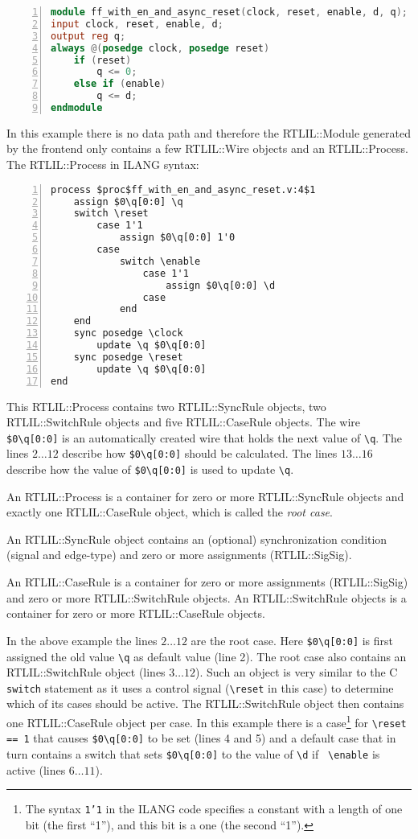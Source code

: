 \begin{lstlisting}[numbers=left,frame=single,language=Verilog]
module ff_with_en_and_async_reset(clock, reset, enable, d, q);
input clock, reset, enable, d;
output reg q;
always @(posedge clock, posedge reset)
	if (reset)
		q <= 0;
	else if (enable)
		q <= d;
endmodule
\end{lstlisting}

In this example there is no data path and therefore the RTLIL::Module generated by
the frontend only contains a few RTLIL::Wire objects and an RTLIL::Process.
The RTLIL::Process in ILANG syntax:

\begin{lstlisting}[numbers=left,frame=single,language=rtlil]
process $proc$ff_with_en_and_async_reset.v:4$1
	assign $0\q[0:0] \q
	switch \reset
		case 1'1
			assign $0\q[0:0] 1'0
		case
			switch \enable
				case 1'1
					assign $0\q[0:0] \d
				case
			end
	end
	sync posedge \clock
		update \q $0\q[0:0]
	sync posedge \reset
		update \q $0\q[0:0]
end
\end{lstlisting}

This RTLIL::Process contains two RTLIL::SyncRule objects, two RTLIL::SwitchRule
objects and five RTLIL::CaseRule objects. The wire {\tt \$0\textbackslash{}q[0:0]}
is an automatically created wire that holds the next value of {\tt \textbackslash{}q}. The lines
$2 \dots 12$ describe how {\tt \$0\textbackslash{}q[0:0]} should be calculated. The
lines $13 \dots 16$ describe how the value of {\tt \$0\textbackslash{}q[0:0]} is used
to update {\tt \textbackslash{}q}.

An RTLIL::Process is a container for zero or more RTLIL::SyncRule objects and
exactly one RTLIL::CaseRule object, which is called the {\it root case}.

An RTLIL::SyncRule object contains an (optional) synchronization condition
(signal and edge-type) and zero or more assignments (RTLIL::SigSig).

An RTLIL::CaseRule is a container for zero or more assignments (RTLIL::SigSig)
and zero or more RTLIL::SwitchRule objects. An RTLIL::SwitchRule objects is a
container for zero or more RTLIL::CaseRule objects.

In the above example the lines $2 \dots 12$ are the root case. Here {\tt \$0\textbackslash{}q[0:0]} is first
assigned the old value {\tt \textbackslash{}q} as default value (line 2). The root case
also contains an RTLIL::SwitchRule object (lines $3 \dots 12$). Such an object is very similar to the C {\tt switch}
statement as it uses a control signal ({\tt \textbackslash{}reset} in this case) to determine
which of its cases should be active. The RTLIL::SwitchRule object then contains one RTLIL::CaseRule
object per case. In this example there is a case\footnote{The
syntax {\tt 1'1} in the ILANG code specifies a constant with a length of one bit (the first ``1''),
and this bit is a one (the second ``1'').} for {\tt \textbackslash{}reset == 1} that causes
{\tt \$0\textbackslash{}q[0:0]} to be set (lines 4 and 5) and a default case that in turn contains a switch that
sets {\tt \$0\textbackslash{}q[0:0]} to the value of {\tt \textbackslash{}d} if {\tt
\textbackslash{}enable} is active (lines $6 \dots 11$).

